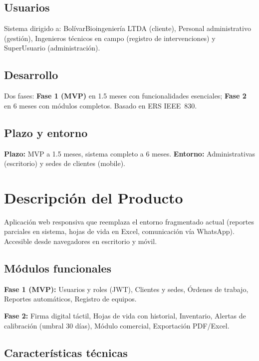\documentclass[12pt,a4paper]{article}
\begin{document}
\subsection{Usuarios}

Sistema dirigido a: BolívarBioingeniería LTDA (cliente), Personal administrativo (gestión), Ingenieros técnicos en campo (registro de intervenciones) y SuperUsuario (administración).

\subsection{Desarrollo}

Dos fases: \textbf{Fase 1 (MVP)} en 1.5 meses con funcionalidades esenciales; \textbf{Fase 2} en 6 meses con módulos completos. Basado en ERS IEEE~830.

\subsection{Plazo y entorno}

\textbf{Plazo:} MVP a 1.5 meses, sistema completo a 6 meses. \textbf{Entorno:} Administrativas (escritorio) y sedes de clientes (mobile).

\section{Descripción del Producto}

Aplicación web responsiva que reemplaza el entorno fragmentado actual (reportes parciales en sistema, hojas de vida en Excel, comunicación vía WhatsApp). Accesible desde navegadores en escritorio y móvil.

\subsection{Módulos funcionales}

\textbf{Fase 1 (MVP):} Usuarios y roles (JWT), Clientes y sedes, Órdenes de trabajo, Reportes automáticos, Registro de equipos.

\textbf{Fase 2:} Firma digital táctil, Hojas de vida con historial, Inventario, Alertas de calibración (umbral 30 días), Módulo comercial, Exportación PDF/Excel.

\subsection{Características técnicas}
\end{document}
